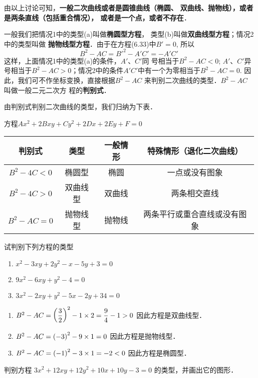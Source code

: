 由以上讨论可知，\textbf{一般二次曲线或者是圆锥曲线（椭圆、
双曲线、抛物线），或者是两条直线（包括重合情况），
或者是一个点，或者不存在}．

一般我们把情况1中的类型(a)叫做\textbf{椭圆型方程}，
类型(b)叫做\textbf{双曲线型方程}；情况2中的类型叫做
\textbf{抛物线型方程}．由于在方程(6.33)中$B'=0$, 所以
\[B^2-AC={B'}^2-A'C'=-A'C'\]
这样，上面情况1中的类型(a)的条件，$A'$、$C'$同
号相当于$B^2-AC<0$; $A'$、$C'$异号相当于$B^2-AC
>0$；情况2中的条件$A'C'$中有一个为零相当于$B^2-
AC=0$. 因此，我们可不作坐标变换，直接根据$B^2-AC$
来判别二次曲线的类型．$B^2-AC$叫做一般二元二次方
程的\textbf{判别式}．

由判别式判别二次曲线的类型，我们归纳为下表．
\begin{center}
    方程$Ax^2+2Bxy+Cy^2+2Dx+2Ey+F=0$
\begin{tabular}{cccc}
\hline
判别式&类型&一般情形&特殊情形（退化二次曲线）\\
\hline
$B^2-4C<0$ &椭圆型&椭圆&一点或没有图象\\
$B^2-4C>0$ &双曲线型&双曲线&两条相交直线\\
$B^2-AC=0$&抛物线型&抛物线&两条平行或重合直线或没有图象\\
\hline
\end{tabular}
\end{center}



\begin{example}
    试判别下列方程的类型
\begin{enumerate}
    \item $x^2-3xy+2y^2-x-5y+3=0$
    \item $9x^2-6xy+y^2-4=0$
    \item $3x^2-2xy+y^2-5x-2y+34=0$
\end{enumerate}
\end{example}

\begin{solution}
\begin{enumerate}
    \item $B^2-AC=\left(\dfrac{3}{2}\right)^2-1\times 2=\dfrac{9}{4}-1>0$
因此方程是双曲线型．
\item $B^2-AC=\left(-3\right)^2-9\times 1=0$
因此方程是抛物线型．
\item $B^2-AC=\left(-1\right)^2-3\times 1=-2<0$
因此方程是椭圆型．
\end{enumerate}    
\end{solution}

\begin{example}
    判别方程
$3x^2+12xy+12y^2+10x+10y-3=0$
的类型，并画出它的图形．
\end{example}


